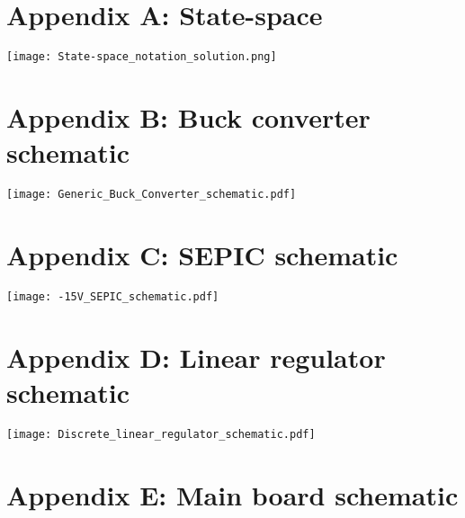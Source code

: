 \section*{Appendix A: State-space}


    \texttt{[image: State-space\_notation\_solution.png]}
\newpage
\newpage

\section*{Appendix B: Buck converter schematic}
\texttt{[image: Generic\_Buck\_Converter\_schematic.pdf]}

\section*{Appendix C: SEPIC schematic}
\texttt{[image: -15V\_SEPIC\_schematic.pdf]}

\section*{Appendix D: Linear regulator schematic}
\texttt{[image: Discrete\_linear\_regulator\_schematic.pdf]}

\section*{Appendix E: Main board schematic}
